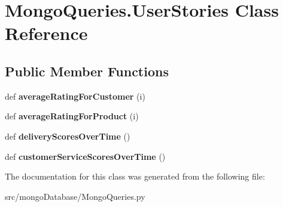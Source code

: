 \hypertarget{class_mongo_queries_1_1_user_stories}{}\section{Mongo\+Queries.\+User\+Stories Class Reference}
\label{class_mongo_queries_1_1_user_stories}
\subsection*{Public Member Functions}
\begin{DoxyCompactItemize}
\item 
\hypertarget{class_mongo_queries_1_1_user_stories_a96555ca89afb9902322c4fc75d56ed23}{}\label{class_mongo_queries_1_1_user_stories_a96555ca89afb9902322c4fc75d56ed23} 
def {\bfseries average\+Rating\+For\+Customer} (i)
\item 
\hypertarget{class_mongo_queries_1_1_user_stories_a92619d4a0c2ffabe1b6d1df13f5bd778}{}\label{class_mongo_queries_1_1_user_stories_a92619d4a0c2ffabe1b6d1df13f5bd778} 
def {\bfseries average\+Rating\+For\+Product} (i)
\item 
\hypertarget{class_mongo_queries_1_1_user_stories_a2d8360b85d038a7f6939810758619a17}{}\label{class_mongo_queries_1_1_user_stories_a2d8360b85d038a7f6939810758619a17} 
def {\bfseries delivery\+Scores\+Over\+Time} ()
\item 
\hypertarget{class_mongo_queries_1_1_user_stories_a356dd82d446efd8db255a979310b256d}{}\label{class_mongo_queries_1_1_user_stories_a356dd82d446efd8db255a979310b256d} 
def {\bfseries customer\+Service\+Scores\+Over\+Time} ()
\end{DoxyCompactItemize}


The documentation for this class was generated from the following file\+:\begin{DoxyCompactItemize}
\item 
src/mongo\+Database/Mongo\+Queries.\+py\end{DoxyCompactItemize}
